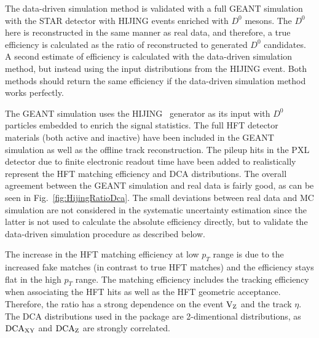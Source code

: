 \documentclass[%
 reprint,	
showpacs,
 amsmath,amssymb,
 aps,
 prc,
]{revtex4-1}
\begin{document}
The data-driven simulation method is validated with a full GEANT simulation with the STAR detector with HIJING events enriched with $D^0$ mesons. The $D^0$ here is reconstructed in the same manner as real data, and therefore, a true efficiency is calculated as the ratio of reconstructed to generated $D^0$ candidates. A second estimate of efficiency is calculated with the data-driven simulation method, but instead using the input distributions from the HIJING event. Both methods should return the same efficiency if the data-driven simulation method works perfectly.

The GEANT simulation uses the HIJING~\cite{HIJING} generator as its input with $D^0$ particles embedded to enrich the signal statistics. The full HFT detector materials (both active and inactive) have been included in the GEANT simulation as well as the offline track reconstruction. The pileup hits in the PXL detector due to finite electronic readout time have been added to realistically represent the HFT matching efficiency and DCA distributions. The overall agreement between the GEANT simulation and real data is fairly good, as can be seen in Fig.~\ref{fig:HijingRatioDca}. The small deviations between real data and MC simulation are not considered in the systematic uncertainty estimation since the latter is not used to calculate the absolute efficiency directly, but to validate the data-driven simulation procedure as described below.

The increase in the HFT matching efficiency at low $p_{T}$ range is due to the increased fake matches (in contrast to true HFT matches) and the efficiency stays flat in the high $p_{T}$ range. The matching efficiency includes the tracking efficiency when associating the HFT hits as well as the HFT geometric acceptance. Therefore, the ratio has a strong dependence on the event $\textup{V}_\textup{Z}$ and the track $\eta$. The DCA distributions used in the package are 2-dimentional distributions, as $\textup{DCA}_{\textup{XY}}$ and $\textup{DCA}_\textup{Z}$ are strongly correlated.
\end{document}
